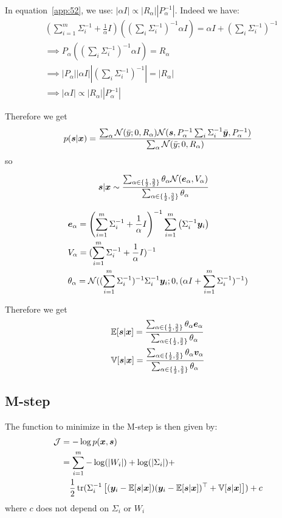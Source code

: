 In equation~\eqref{app:52}, we use: $|\alpha I | \propto |R_{\alpha}||P_{\alpha}^{-1}|$. Indeed we have:
\begin{align}
&(\sum_{i=1}^m \Sigma_i^{-1} + \frac1{\alpha}I) ((\sum_i \Sigma_i^{-1})^{-1} \alpha I) = \alpha I + (\sum_i \Sigma_i^{-1})^{-1} \\
&\implies P_{\alpha}((\sum_i \Sigma_i^{-1})^{-1} \alpha I) = R_{\alpha} \\
& \implies |P_{\alpha}||\alpha I||(\sum_i \Sigma_i^{-1})^{-1}| = |R_{\alpha}| \\
& \implies |\alpha I | \propto |R_{\alpha}||P_{\alpha}^{-1}|
\end{align}


 Therefore we get
 \begin{align}
     p(\boldsymbol{s} | \boldsymbol{x}) &= \frac{\sum_{\alpha} \mathcal{N}(\bar{y}; 0, R_{\alpha}) \mathcal{N}(\boldsymbol{s}, P_{\alpha}^{-1} \sum_i \Sigma_i^{-1}\bar{\boldsymbol{y}}, P_{\alpha}^{-1})}{\sum_{\alpha} \mathcal{N}(\bar{y}; 0, R_{\alpha})} \\
 \end{align}
so 

 \begin{align}
  &\boldsymbol{s}|\boldsymbol{x} \sim \frac{\sum_{\alpha \in \{\frac12, \frac32 \}}\theta_{\alpha} \mathcal{N}( \boldsymbol{e}_{\alpha}, V_{\alpha})}{\sum_{\alpha \in \{\frac12, \frac32 \}}\theta_{\alpha}}
 \end{align}

 \begin{align}
   &\boldsymbol{e}_{\alpha}= \left(\sum_{i=1}^m \Sigma_i^{-1}  + \frac1{\alpha}I \right)^{-1}  \sum_{i=1}^m \left(\Sigma_i^{-1} \boldsymbol{y}_i \right) \\
   &V_{\alpha} = (\sum_{i=1}^m \Sigma_i^{-1}  + \frac1{\alpha}I)^{-1} \\ 
   &\theta_{\alpha} = \mathcal{N}((\sum_{i=1}^m \Sigma_i^{-1})^{-1} \Sigma_i^{-1} \boldsymbol{y}_i; 0, (\alpha I + \sum_{i=1}^m \Sigma_i^{-1})^{-1})
 \end{align}
  
 Therefore we get
\begin{align}
	&\mathbb{E}[\boldsymbol{s} | \boldsymbol{x}] = \frac{\sum_{\alpha \in \{\frac12, \frac32
  \}}\theta_{\alpha} \boldsymbol{e}_{\alpha}}{\sum_{\alpha \in
  \{\frac12, \frac32 \}}\theta_{\alpha}} \\
  &\mathbb{V}[\boldsymbol{s} | \boldsymbol{x}] = \frac{\sum_{\alpha \in \{\frac12, \frac32
    \}}\theta_{\alpha} \boldsymbol{v}_{\alpha}}{\sum_{\alpha \in
    \{\frac12, \frac32 \}}\theta_{\alpha}}
\end{align}
    

\subsection{M-step}
The function to minimize in the M-step is then given by:
\begin{align}
  \mathcal{J} &= -\log p(\boldsymbol{x}, \boldsymbol{s}) \\
  &= \sum_{i=1}^m - \log(|W_i|) + \log(|\Sigma_i|) + \\& \enspace \enspace \frac12 \mathop{\mathrm{tr}}(\Sigma_i^{-1} \left[(\boldsymbol{y}_i - \mathbb{E}[\boldsymbol{s} | \boldsymbol{x}]) (\boldsymbol{y}_i - \mathbb{E}[\boldsymbol{s} | \boldsymbol{x}])^{\top}+ \mathbb{V}[\boldsymbol{s} | \boldsymbol{x}]\right]) + c
\end{align}
where $c$ does not depend on $\Sigma_i$ or $W_i$

